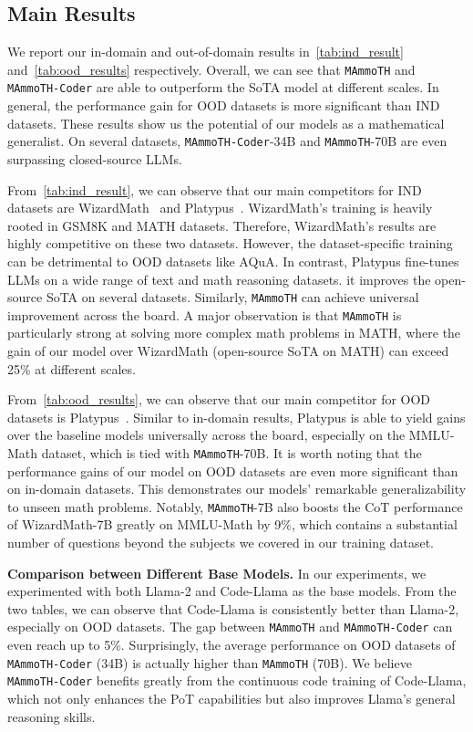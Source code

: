 \subsection{Main Results} We report our in-domain and out-of-domain results in~\autoref{tab:ind_result} and~\autoref{tab:ood_results} respectively. Overall, we can see that \texttt{MAmmoTH} and \texttt{MAmmoTH-Coder} are able to outperform the SoTA model at different scales. In general, the performance gain for OOD datasets is more significant than IND datasets. These results show us the potential of our models as a mathematical generalist. On several datasets, \texttt{MAmmoTH-Coder}-34B and \texttt{MAmmoTH}-70B are even surpassing closed-source LLMs. 

From~\autoref{tab:ind_result}, we can observe that our main competitors for IND datasets are WizardMath~\citep{luo2023wizardmath} and Platypus~\citep{lee2023platypus}. WizardMath's training is heavily rooted in GSM8K and MATH datasets. Therefore, WizardMath's results are highly competitive on these two datasets. However, the dataset-specific training can be detrimental to OOD datasets like AQuA. In contrast, Platypus fine-tunes LLMs on a wide range of text and math reasoning datasets. it improves the open-source SoTA on several datasets. Similarly, \texttt{MAmmoTH} can achieve universal improvement across the board. A major observation is that \texttt{MAmmoTH} is particularly strong at solving more complex math problems in MATH, where the gain of our model over WizardMath (open-source SoTA on MATH) can exceed 25\% at different scales. 

From~\autoref{tab:ood_results}, we can observe that our main competitor for OOD datasets is Platypus~\citep{lee2023platypus}. Similar to in-domain results, Platypus is able to yield gains over the baseline models universally across the board, especially on the MMLU-Math dataset, which is tied with \texttt{MAmmoTH}-70B. It is worth noting that the performance gains of our model on OOD datasets are even more significant than on in-domain datasets. This demonstrates our models' remarkable generalizability to unseen math problems. Notably, \texttt{MAmmoTH}-7B also boosts the CoT performance of WizardMath-7B greatly on MMLU-Math by 9\%, which contains a substantial number of questions beyond the subjects we covered in our training dataset.

\textbf{Comparison between Different Base Models.} In our experiments, we experimented with both Llama-2 and Code-Llama as the base models. From the two tables, we can observe that Code-Llama is consistently better than Llama-2, especially on OOD datasets. The gap between \texttt{MAmmoTH} and \texttt{MAmmoTH-Coder} can even reach up to 5\%. Surprisingly, the average performance on OOD datasets of \texttt{MAmmoTH-Coder} (34B) is actually higher than \texttt{MAmmoTH} (70B). We believe \texttt{MAmmoTH-Coder} benefits greatly from the continuous code training of Code-Llama, which not only enhances the PoT capabilities but also improves Llama's general reasoning skills. 

